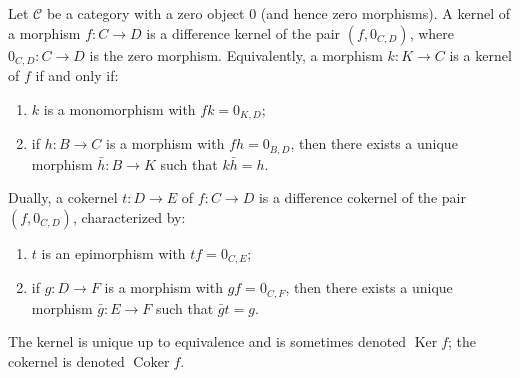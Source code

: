 Let $\mathcal{C}$ be a category with a zero object $0$ (and hence zero morphisms). A kernel of a morphism $f : C \to D$ is a difference kernel of the pair $(f, 0_{C,D})$, where $0_{C,D} : C \to D$ is the zero morphism. Equivalently, a morphism $k : K \to C$ is a kernel of $f$ if and only if:
\begin{enumerate}
\item[(i)] $k$ is a monomorphism with $f k = 0_{K,D}$;
\item[(ii)] if $h : B \to C$ is a morphism with $f h = 0_{B,D}$, then there exists a unique morphism $\bar{h} : B \to K$ such that $k \bar{h} = h$.
\end{enumerate}

Dually, a cokernel $t : D \to E$ of $f : C \to D$ is a difference cokernel of the pair $(f, 0_{C,D})$, characterized by:
\begin{enumerate}
\item[(iii)] $t$ is an epimorphism with $t f = 0_{C,E}$;
\item[(iv)] if $g : D \to F$ is a morphism with $g f = 0_{C,F}$, then there exists a unique morphism $\bar{g} : E \to F$ such that $\bar{g} t = g$.
\end{enumerate}
The kernel is unique up to equivalence and is sometimes denoted $\operatorname{Ker} f$; the cokernel is denoted $\operatorname{Coker} f$.
